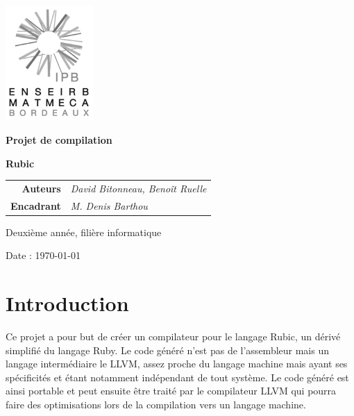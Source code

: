 \documentclass[12pt]{article}
\begin{document}
\thispagestyle{empty}
\noindent\includegraphics[width=0.25\textwidth]{enseirb-matmeca}


\begin{center}
    {\Huge\textbf{Projet de compilation}


    \textbf{Rubic}}
\end{center}


\begin{tabular}{r@{:~}l}
	\textbf{Auteurs} & \textit{David Bitonneau, Benoît Ruelle}\\
	\textbf{Encadrant} & \textit{M. Denis Barthou}\\
\end{tabular}


\begin{center}Deuxième année, filière informatique

    Date : \today
\end{center}

\newpage

\section{Introduction}

Ce projet a pour but de créer un compilateur pour le langage Rubic, un dérivé
simplifié du langage Ruby. Le code généré n'est pas de l'assembleur mais un
langage intermédiaire le LLVM, assez proche du langage machine mais ayant ses
spécificités et étant notamment indépendant de tout système. Le code généré
est ainsi portable et peut ensuite être traité par le compilateur LLVM qui
pourra faire des optimisations lors de la compilation vers un langage machine.
\end{document}
